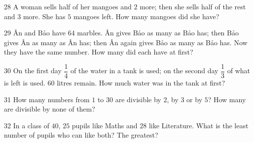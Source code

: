 \gap
\begin{probbox}{28}{\relax}
A woman sells half of her mangoes and $2$ more; then she sells half of the rest and $3$ more. She has $5$ mangoes left. How many mangoes did she have?
\end{probbox}
\gap
\begin{probbox}{29}{\relax}
Ân and Bảo have $64$ marbles. Ân gives Bảo as many as Bảo has; then Bảo gives Ân as many as Ân has; then Ân again gives Bảo as many as Bảo has. Now they have the same number. How many did each have at first?
\end{probbox}
\gap
\begin{probbox}{30}{\relax}
On the first day $\dfrac14$ of the water in a tank is used; on the second day $\dfrac13$ of what is left is used. $60$ litres remain. How much water was in the tank at first?
\end{probbox}
\begin{probbox}{31}{}
How many numbers from $1$ to $30$ are divisible by $2$, by $3$ or by $5$? How many are divisible by none of them?
\end{probbox}
\gap
\begin{probbox}{32}{}
In a class of $40$, $25$ pupils like Maths and $28$ like Literature. What is the least number of pupils who can like both? The greatest?
\end{probbox}
